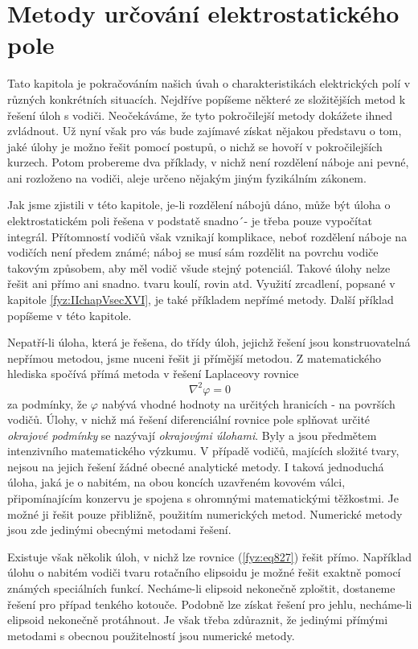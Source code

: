 \section{Metody určování elektrostatického pole}\label{fyz:IIchapVsecXXII}
  Tato kapitola je pokračováním našich úvah o charakteristikách elektrických polí v různých
  konkrétních situacích. Nejdříve popíšeme některé ze složitějších metod k řešení úloh s vodiči.
  Neočekáváme, že tyto pokročilejší metody dokážete ihned zvládnout. Už nyní však pro vás bude
  zajímavé získat nějakou představu o tom, jaké úlohy je možno řešit pomocí postupů, o nichž se
  hovoří v pokročilejších kurzech. Potom probereme dva příklady, v nichž není rozdělení náboje ani
  pevné, ani rozloženo na vodiči, aleje určeno nějakým jiným fyzikálním zákonem.

  Jak jsme zjistili v této kapitole, je-li rozdělení nábojů dáno, může být úloha o elektrostatickém
  poli řešena v podstatě snadno´- je třeba pouze vypočítat integrál. Přítomností vodičů však
  vznikají komplikace, neboť rozdělení náboje na vodičích není předem známé; náboj se musí sám
  rozdělit na povrchu vodiče takovým způsobem, aby měl vodič všude stejný potenciál. Takové úlohy
  nelze řešit ani přímo ani snadno. tvaru koulí, rovin atd. Využití zrcadlení, popsané v kapitole
  \ref{fyz:IIchapVsecXVI}, je také příkladem nepřímé metody. Další příklad popíšeme v této kapitole.

  Nepatří-li úloha, která je řešena, do třídy úloh, jejichž řešení jsou konstruovatelná nepřímou
  metodou, jsme nuceni řešit ji přímější metodou. Z matematického hlediska spočívá přímá metoda v
  řešení Laplaceovy rovnice 
  \begin{equation}\label{fyz:eq827}
    \nabla^2\varphi = 0
  \end{equation}
  za podmínky, že \(\varphi\) nabývá vhodné hodnoty na určitých hranicích - na površích vodičů.
  Úlohy, v nichž má řešení diferenciální rovnice pole splňovat určité \emph{okrajové podmínky} se
  nazývají \emph{okrajovými úlohami}. Byly a jsou předmětem intenzivního matematického výzkumu. V
  případě vodičů, majících složité tvary, nejsou na jejich řešení žádné obecné analytické metody. I
  taková jednoduchá úloha, jaká je o nabitém, na obou koncích uzavřeném kovovém válci,
  připomínajícím konzervu je spojena s ohromnými matematickými těžkostmi. Je možné ji řešit pouze
  přibližně, použitím numerických metod. Numerické metody jsou zde jedinými obecnými metodami
  řešení.

  Existuje však několik úloh, v nichž lze rovnice (\ref{fyz:eq827}) řešit přímo. Například úlohu o
  nabitém vodiči tvaru rotačního elipsoidu je možné řešit exaktně pomocí známých speciálních funkcí.
  Necháme-li elipsoid nekonečně zploštit, dostaneme řešení pro případ tenkého kotouče. Podobně lze
  získat řešení pro jehlu, necháme-li elipsoid nekonečně protáhnout. Je však třeba zdůraznit, že
  jedinými přímými metodami s obecnou použitelností jsou numerické metody.

